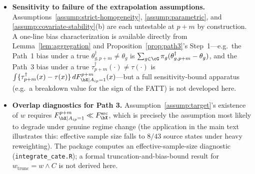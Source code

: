 \documentclass{article}
\begin{document}
\begin{itemize}
\item \textbf{Sensitivity to failure of the extrapolation assumptions.} Assumptions~\ref{assump:strict-homogeneity}, \ref{assump:parametric}, and \ref{assump:covariate-stability}(b) are each untestable at $p+m$ by construction. A one-line bias characterization is available directly from Lemma~\ref{lem:aggregation} and Proposition~\ref{prop:path3}'s Step~1---e.g.\ the Path~1 bias under a true $\theta_{g,p+m}^\dagger\neq\theta_g$ is $\sum_{g\in\cG}\pi_g(\theta_{g,p+m}^\dagger-\theta_g)$, and the Path~3 bias under a true $\tau^\dagger_{p+m}(\cdot)\neq\tau(\cdot)$ is $\int\{\tau^\dagger_{p+m}(x)-\tau(x)\}\,dF^{p+m}_{\bX\mid A_{ip}=1}(x)$---but a full sensitivity-bound apparatus (e.g.\ a breakdown value for the sign of the FATT) is not developed here.
\item \textbf{Overlap diagnostics for Path 3.} Assumption~\ref{assump:target}'s existence of $w$ requires $F^{p+m}_{\bX\mid A_{ip}=1}\ll F^{\mathrm{src}}_\bX$, which is precisely the assumption most likely to degrade under genuine regime change (the application in the main text illustrates this: effective sample size falls to $8/43$ source states under heavy reweighting). The package computes an effective-sample-size diagnostic (\texttt{integrate\_cate.R}); a formal truncation-and-bias-bound result for $w_{\mathrm{trunc}}=w\wedge C$ is not derived here.
\end{itemize}



\end{document}
